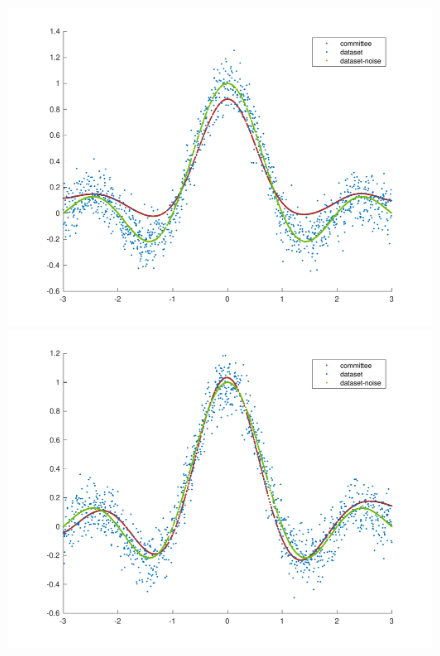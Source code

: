 \begingroup
\setlength{\columnsep}{0.8cm}
\setlength{\intextsep}{0.5cm}
\begin{figure}
\vspace{-1.0cm}
\begin{minipage}{\linewidth}
    \centering\captionsetup[subfigure]{justification=centering}
\includegraphics[width=\linewidth]{../src/figures/committee/sinc_2_models}
\includegraphics[width=\linewidth]{../src/figures/committee/sinc_4_models}

\end{minipage}
\end{figure}
